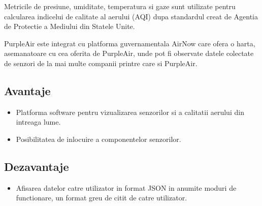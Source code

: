 Metricile de presiune, umiditate, temperatura si gaze sunt utilizate pentru calcularea indicelui de calitate al aerului (AQI) dupa standardul creat de Agentia de 
Protectie a Mediului din Statele Unite.

PurpleAir este integrat cu platforma guvernamentala AirNow care ofera o harta, asemanatoare cu cea oferita de PurpleAir, unde pot fi observate datele colectate 
de senzori de la mai multe companii printre care si PurpleAir.

\subsection{Avantaje}\label{subsec:sb_purpleair_avantaje}
\begin{itemize}
	\item Platforma software pentru vizualizarea senzorilor si a calitatii aerului din intreaga lume.
	\item Posibilitatea de inlocuire a componentelor senzorilor.
\end{itemize}
\subsection{Dezavantaje}\label{subsec:sb_purpleair_dezavantaje}
\begin{itemize}
	\item Afisarea datelor catre utilizator in format JSON in anumite moduri de functionare, un format greu de citit de catre utilizator.
\end{itemize}